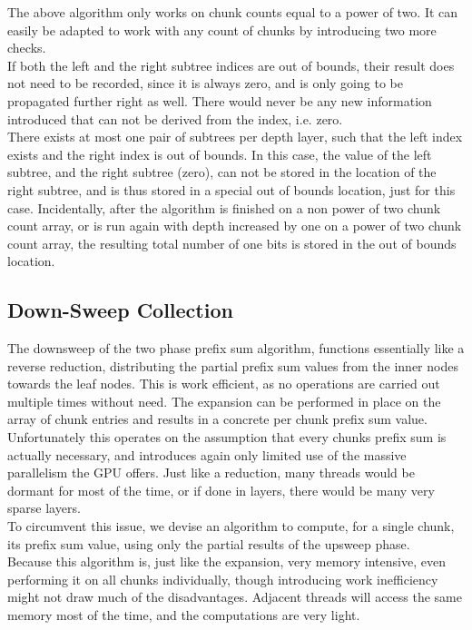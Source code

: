 \documentclass{tudscrreprt}
\begin{document}
				The above algorithm only works on chunk counts equal to a power of two. It can easily be adapted to work with any count of chunks by introducing two more checks. \\
				If both the left and the right subtree indices are out of bounds, their result does not need to be recorded, since it is always zero, and is only going to be propagated further right as well. There would never be any new information introduced that can not be derived from the index, i.e. zero. \\
				There exists at most one pair of subtrees per depth layer, such that the left index exists and the right index is out of bounds. In this case, the value of the left subtree, and the right subtree (zero), can not be stored in the location of the right subtree, and is thus stored in a special out of bounds location, just for this case. Incidentally, after the algorithm is finished on a non power of two chunk count array, or is run again with depth increased by one on a power of two chunk count array, the resulting total number of one bits is stored in the out of bounds location. \\
			
			\subsection{Down-Sweep Collection}
				The downsweep of the two phase prefix sum algorithm, functions essentially like a reverse reduction, distributing the partial prefix sum values from the inner nodes towards the leaf nodes. This is work efficient, as no operations are carried out multiple times without need. The expansion can be performed in place on the array of chunk entries and results in a concrete per chunk prefix sum value. \\
				Unfortunately this operates on the assumption that every chunks prefix sum is actually necessary, and introduces again only limited use of the massive parallelism the GPU offers. Just like a reduction, many threads would be dormant for most of the time, or if done in layers, there would be many very sparse layers. \\
				
				To circumvent this issue, we devise an algorithm to compute, for a single chunk, its prefix sum value, using only the partial results of the upsweep phase. \\
				Because this algorithm is, just like the expansion, very memory intensive, even performing it on all chunks individually, though introducing work inefficiency might not draw much of the disadvantages. Adjacent threads will access the same memory most of the time, and the computations are very light. \\
				
\end{document}
